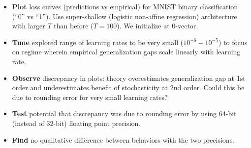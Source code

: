 \documentclass[12pt]{article}
\begin{document}

        \begin{itemize}
            \item {\bf Plot} loss curves (predictions vs empirical) for MNIST binary classification (``0'' vs ``1'').
                Use super-shallow (logistic non-affine regression) architecture with larger $T$ than before ($T=100$).
                We initialize at $0$-vector.
            \item {\bf Tune} explored range of learning rates to be very small ($10^{-6} - 10^{-5}$) to focus on
                regime wherein empirical generalization gaps scale linearly with learning rate.
            \item {\bf Observe} discrepancy in plots: theory overestimates generalization gap at 1st order and
                underestimates benefit of stochasticity at 2nd order.  Could this be due to rounding error for very
                small learning rates?
            \item {\bf Test} potential that discrepancy was due to rounding error by using 64-bit (instead of 32-bit)
                floating point precision.
            \item {\bf Find} no qualitative difference between behaviors with the two precisions.
        \end{itemize}

\end{document}

